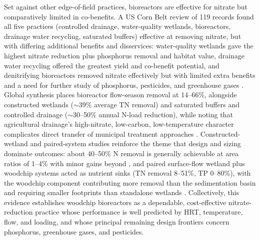 \documentclass[11pt]{article}
\begin{document}
Set against other edge-of-field practices, bioreactors are effective for nitrate but comparatively limited in co-benefits. A US Corn Belt review of 119 records found all five practices (controlled drainage, water-quality wetlands, bioreactors, drainage water recycling, saturated buffers) effective at removing nitrate, but with differing additional benefits and disservices: water-quality wetlands gave the highest nitrate reduction plus phosphorus removal and habitat value, drainage water recycling offered the greatest yield and co-benefit potential, and denitrifying bioreactors removed nitrate effectively but with limited extra benefits and a need for further study of phosphorus, pesticides, and greenhouse gases \parencite{Mitchell2023}. Global synthesis places bioreactor flow-season removal at 14--66\%, alongside constructed wetlands ($\sim$39\% average TN removal) and saturated buffers and controlled drainage ($\sim$30--50\% annual N-load reduction), while noting that agricultural drainage's high-nitrate, low-carbon, low-temperature character complicates direct transfer of municipal treatment approaches \parencite{Wang2025b}. Constructed-wetland and paired-system studies reinforce the theme that design and sizing dominate outcomes: about 40--50\% N removal is generally achievable at area ratios of 1--4\% with minor gains beyond \parencite{Mendes2021}, and paired surface-flow wetland plus woodchip systems acted as nutrient sinks (TN removal 8--51\%, TP 0--80\%), with the woodchip component contributing more removal than the sedimentation basin and requiring smaller footprints than standalone wetlands \parencite{Pugliese2020}. Collectively, this evidence establishes woodchip bioreactors as a dependable, cost-effective nitrate-reduction practice whose performance is well predicted by HRT, temperature, flow, and loading, and whose principal remaining design frontiers concern phosphorus, greenhouse gases, and pesticides.

\printbibliography
\end{document}
